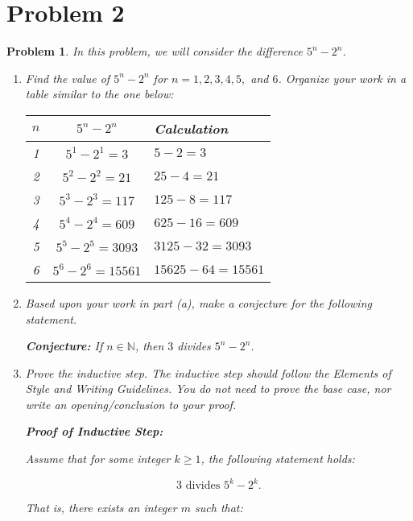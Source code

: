 \documentclass[12pt]{article}
\newtheorem{problem}{Problem}
\theoremstyle{definition}
\begin{document}
\newpage

\section*{Problem 2}

\begin{problem}
In this problem, we will consider the difference \( 5^n - 2^n \).

\begin{enumerate}[label=(\alph*)]
    \item Find the value of \( 5^n - 2^n \) for \( n = 1, 2, 3, 4, 5, \) and \( 6 \). Organize your work in a table similar to the one below:

    \begin{center}
    \begin{tabular}{|c|c|l|}
    \hline
    \( n \) & \( 5^n - 2^n \) & Calculation \\
    \hline
    1 & \( 5^1 - 2^1 = 3 \) & \( 5 - 2 = 3 \) \\
    2 & \( 5^2 - 2^2 = 21 \) & \( 25 - 4 = 21 \) \\
    3 & \( 5^3 - 2^3 = 117 \) & \( 125 - 8 = 117 \) \\
    4 & \( 5^4 - 2^4 = 609 \) & \( 625 - 16 = 609 \) \\
    5 & \( 5^5 - 2^5 = 3093 \) & \( 3125 - 32 = 3093 \) \\
    6 & \( 5^6 - 2^6 = 15561 \) & \( 15625 - 64 = 15561 \) \\
    \hline
    \end{tabular}
    \end{center}
    
    \item Based upon your work in part (a), make a conjecture for the following statement.

    \textbf{Conjecture:} If \( n \in \mathbb{N} \), then \( 3 \) divides \( 5^n - 2^n \).

    \item Prove the inductive step. The inductive step should follow the Elements of Style and Writing Guidelines. You do not need to prove the base case, nor write an opening/conclusion to your proof.

    \textbf{Proof of Inductive Step:}

    Assume that for some integer \( k \geq 1 \), the following statement holds:

    \[
    3 \text{ divides } 5^k - 2^k.
    \]

    That is, there exists an integer \( m \) such that:


\end{enumerate}
\end{problem}
\end{document}
